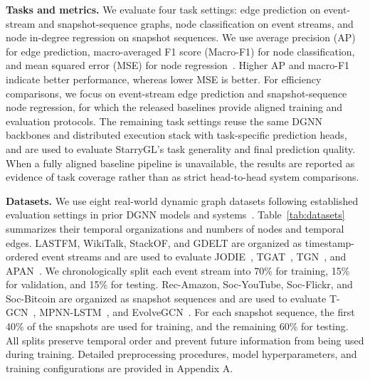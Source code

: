 \noindent\textbf{Tasks and metrics.}
We evaluate four task settings: edge prediction on event-stream and
snapshot-sequence graphs, node classification on event streams, and
node in-degree regression on snapshot sequences. We use average
precision (AP) for edge prediction, macro-averaged F1 score
(Macro-F1) for node classification, and mean squared error (MSE) for
node regression~\cite{tgn,huangflaredtdg}. Higher AP and macro-F1
indicate better performance, whereas lower MSE is better.
For efficiency comparisons, we focus on event-stream edge prediction
and snapshot-sequence node regression, for which the released
baselines provide aligned training and evaluation protocols. The
remaining task settings reuse the same DGNN backbones and distributed
execution stack with task-specific prediction heads, and are used to
evaluate StarryGL's task generality and final prediction quality.
When a fully aligned baseline pipeline is unavailable, the results are
reported as evidence of task coverage rather than as strict
head-to-head system comparisons.

\noindent\textbf{Datasets.}
We use eight real-world dynamic graph datasets following established
evaluation settings in prior DGNN models and
systems~\cite{zhou2022tgl,dataset1}.
Table~\ref{tab:datasets} summarizes their temporal organizations and
numbers of nodes and temporal edges. LASTFM, WikiTalk, StackOF, and
GDELT are organized as timestamp-ordered event streams and are used
to evaluate JODIE~\cite{jodie}, TGAT~\cite{tgat},
TGN~\cite{tgn}, and APAN~\cite{apan}. We chronologically split each
event stream into 70\% for training, 15\% for validation, and 15\%
for testing. Rec-Amazon, Soc-YouTube, Soc-Flickr, and Soc-Bitcoin are organized
as snapshot sequences and are used to evaluate
T-GCN~\cite{tgcn}, MPNN-LSTM~\cite{mpnnlstm}, and
EvolveGCN~\cite{evolvegcn}. For each snapshot sequence, the first
40\% of the snapshots are used for training, and the remaining 60\%
for testing. All splits preserve temporal order and prevent future
information from being used during training. Detailed preprocessing
procedures, model hyperparameters, and training configurations are
provided in Appendix A.

